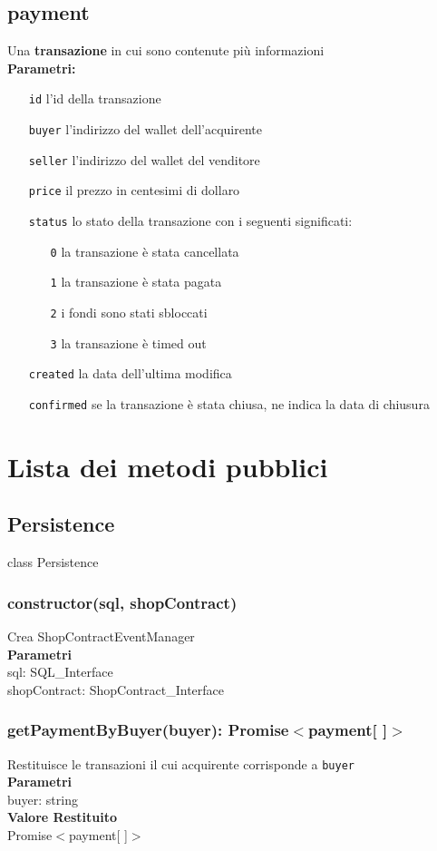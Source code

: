 \documentclass[a4paper, 12pt]{article}
\begin{document}
\subsection{payment}
Una \textbf{transazione} in cui sono contenute più informazioni\\
\textbf{Parametri:}
\begin{itemize}
\item[\texttt{id}] l'id della transazione
\item[\texttt{buyer}] l'indirizzo del wallet dell'acquirente
\item[\texttt{seller}] l'indirizzo del wallet del venditore
\item[\texttt{price}] il prezzo in centesimi di dollaro
\item[\texttt{status}] lo stato della transazione con i seguenti significati:
	\begin{itemize}
	\item[\texttt{0}] la transazione è stata cancellata
	\item[\texttt{1}] la transazione è stata pagata
	\item[\texttt{2}] i fondi sono stati sbloccati
	\item[\texttt{3}] la transazione è timed out
	\end{itemize}
\item[\texttt{created}] la data dell'ultima modifica
\item[\texttt{confirmed}] se la transazione è stata chiusa, ne indica la data di chiusura
\end{itemize}

\section{Lista dei metodi pubblici}
\subsection{Persistence}
class Persistence
\subsubsection{constructor(sql, shopContract)}
Crea ShopContractEventManager\\
\textbf{Parametri}\\
sql: SQL\_Interface\\
shopContract: ShopContract\_Interface
\subsubsection{getPaymentByBuyer(buyer): Promise$<$payment[ ]$>$}
Restituisce le transazioni il cui acquirente corrisponde a \texttt{buyer}\\
\textbf{Parametri}\\
buyer: string\\
\textbf{Valore Restituito}\\
Promise$<$payment[ ]$>$
\end{document}
